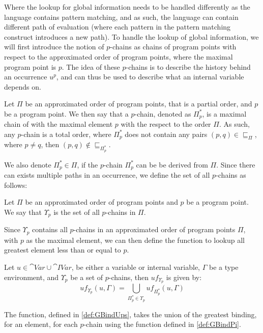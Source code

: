 \documentclass[acmsmall,sigplan]{acmart}
\begin{document}
Where the lookup for global information needs to be handled differently as the language contains pattern matching, and as such, the language can contain different path of evaluation (where each pattern in the pattern matching construct introduces a new path).
To handle the lookup of global information, we will first introduce the notion of $p$-chains as chains of program points with respect to the approximated order of program points, where the maximal program point is $p$.
The idea of these $p$-chains is to describe the history behind an occurrence $u^p$, and can thus be used to describe what an internal variable depends on.

\begin{definition}[$p$-chains]
	Let $\Pi$ be an approximated order of program points, that is a partial order, and $p$ be a program point.
	We then say that a $p$-chain, denoted as $\Pi_p^{*}$, is a maximal chain of with the maximal element $p$ with the respect to the order $\Pi$.
	As such, any $p$-chain is a total order, where $\Pi_p^{*}$ does not contain any pairs $(p,q)\in\sqsubseteq_\Pi$, where $p\neq q$, then $(p,q)\notin\sqsubseteq_{\Pi_p^{*}}$.
\end{definition}

We also denote $\Pi_p^{*}\in\Pi$, if the $p$-chain $\Pi_p^{*}$ can be be derived from $\Pi$.
Since there can exists multiple paths in an occurrence, we define the set of all $p$-chains as follows:

\begin{definition}[]
	Let $\Pi$ be an approximated order of program points and $p$ be a program point.
	We say that $\Upsilon_p$ is the set of all $p$-chains in $\Pi$.
\end{definition}

Since $\Upsilon_p$ contains all $p$-chains in an approximated order of program points $\Pi$, with $p$ as the maximal element, we can then define the function to lookup all greatest element less than or equal to $p$.

\begin{definition}[]\label{def:GBindUps}
	Let $u\in \cat{Var}\cup\cat{IVar}$, be either a variable or internal variable, $\Gamma$ be a type environment, and $\Upsilon_p$ be a set of $p$-chains, then $uf_{\Upsilon_p}$ is given by:
	$$uf_{\Upsilon_p}(u,\Gamma)=\bigcup_{\Pi_p^{*}\in\Upsilon_p}uf_{\Pi_p^{*}}(u,\Gamma)$$
\end{definition}

The function, defined in \cref{def:GBindUps}, takes the union of the greatest binding, for an element, for each $p$-chain using the function defined in \cref{def:GBindPi}.
\end{document}
